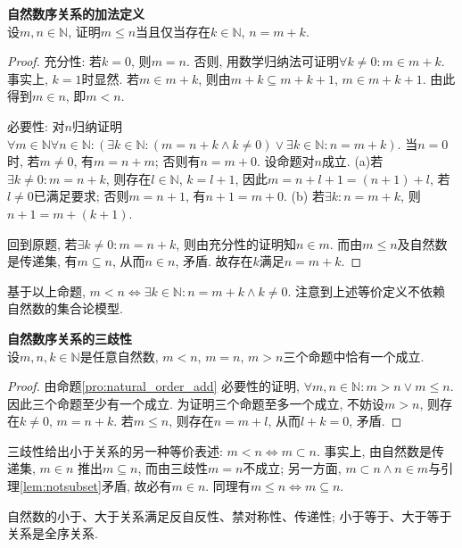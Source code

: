 \begin{pro}\textbf{自然数序关系的加法定义}\\
设$m, n\in \mathbb{N}$, 证明$m\le n$当且仅当存在$k\in \mathbb{N}$, $n=m+k$. 
\label{pro:natural_order_add}
\end{pro}
\begin{proof}
\par 充分性: 若$k=0$, 则$m=n$. 否则, 用数学归纳法可证明$\forall k\neq 0: m\in m+k$. 事实上, $k=1$时显然. 若$m\in m+k$, 则由$m+k \subseteq m+k+1$, $m\in m+k+1$. 由此得到$m\in n$, 即$m<n$.
\par 必要性: 对$n$归纳证明$\forall m\in \mathbb{N}\forall n\in \mathbb{N}: (\exists k\in \mathbb{N}: (m=n+k \land k\neq 0) \lor \exists k\in \mathbb{N}: n=m+k)$. 当$n=0$时, 若$m\neq 0$, 有$m=n+m$; 否则有$n=m+0$. 设命题对$n$成立. (a)若$\exists k\neq 0: m=n+k$, 则存在$l\in \mathbb{N}$, $k=l+1$, 因此$m=n+l+1=(n+1)+l$, 若$l\neq 0$已满足要求; 否则$m=n+1$, 有$n+1=m+0$. (b) 若$\exists k: n=m+k$, 则$n+1=m+(k+1)$. 
\par 回到原题, 若$\exists k\neq 0: m=n+k$, 则由充分性的证明知$n\in m$. 而由$m\le n$及自然数是传递集, 有$m\subseteq n$, 从而$n\in n$, 矛盾. 故存在$k$满足$n=m+k$.
\end{proof} 
\par 基于以上命题, $m<n\iff \exists k\in \mathbb{N}: n=m+k\land k\neq 0$. 注意到上述等价定义不依赖自然数的集合论模型. 

\begin{pro}\textbf{自然数序关系的三歧性}\\
设$m, n, k\in \mathbb{N}$是任意自然数, $m<n$, $m=n$, $m>n$三个命题中恰有一个成立. 
\end{pro}
\begin{proof}
由命题\ref{pro:natural_order_add} 必要性的证明, $\forall m, n\in \mathbb{N}: m>n \lor m\le n$. 因此三个命题至少有一个成立. 为证明三个命题至多一个成立, 不妨设$m>n$, 则存在$k\neq 0$, $m=n+k$. 若$m\le n$, 则存在$n=m+l$, 从而$l+k=0$, 矛盾.
\end{proof}
三歧性给出小于关系的另一种等价表述: $m<n\iff m\subset n$. 事实上, 由自然数是传递集, $m\in n$ 推出$m\subseteq n$, 而由三歧性$m=n$不成立; 另一方面, $m\subset n \land n\in m$与引理\ref{lem:notsubset}矛盾, 故必有$m\in n$. 同理有$m\le n\iff m\subseteq n$.
\par 自然数的小于、大于关系满足反自反性、禁对称性、传递性; 小于等于、大于等于关系是全序关系. 


